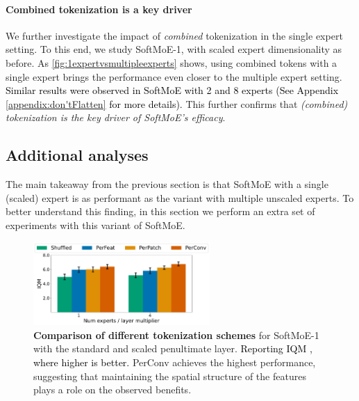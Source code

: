 \documentclass{article} %
\newcommand{\rebuttal}[1]{\textcolor{black}{#1}}
\begin{document}
\paragraph{Combined tokenization is a key driver} We further investigate the impact of \textit{combined} tokenization in the single expert setting. To this end, we study SoftMoE-1, with scaled expert dimensionality as before. As \autoref{fig:1expertvsmultipleexperts} shows, using combined tokens with a single expert brings the performance even closer to the multiple expert setting. \rebuttal{Similar results were observed in SoftMoE with 2 and 8 experts (See Appendix \ref{appendix:don'tFlatten} for more details).} This further confirms that {\em (combined) tokenization is the key driver of SoftMoE's efficacy}. 

\subsection{Additional analyses}
The main takeaway from the previous section is that SoftMoE with a single (scaled) expert  is as performant as the variant with multiple unscaled experts. To better understand this finding, in this section we perform an extra set of experiments with this variant of SoftMoE.



\begin{figure}[!t]
    \centering
    \includegraphics[width=0.6\textwidth]{figures/results/tokentypes__just_iqm_bar.pdf}
    \caption{\textbf{Comparison of different tokenization schemes} for SoftMoE-1 with the standard and scaled penultimate layer. \rebuttal{Reporting IQM \citep{agarwal2021deep}, where higher is better.}  PerConv achieves the highest performance, suggesting that maintaining the spatial structure of the features plays a role on the observed benefits.}
    \label{fig:tokentypesBar}
\end{figure}
\end{document}
